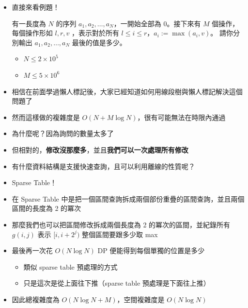 \documentclass[standalone]{beamer}
\begin{document}
\begin{frame}[fragile]{}
  \begin{itemize}
    \item 直接來看例題！
    \begin{problem}
      有一長度為 $N$ 的序列 $a_1,a_2,\dots,a_N$，一開始全部為 $0$。接下來有 $M$ 個操作，每個操作形如 $l, r, v$ ，表示對於所有 $l \leq i \leq r$，$a_i := \max(a_i, v)$。
      請你分別輸出 $a_1,a_2,\dots, a_N$ 最後的值是多少。

      \begin{itemize}
          \item
              $N \leq 2\times 10^5$
          \item
              $M \leq 5\times 10^6$
      \end{itemize}
    \end{problem}
  \end{itemize}
\end{frame}

\begin{frame}[fragile]{}
  \begin{itemize}
    \item 相信在前面學過懶人標記後，大家已經知道如何用線段樹與懶人標記解決這個問題了
    \item 然而這樣做的複雜度是 $O(N+M\log N)$，很有可能無法在時限內通過
    \item 為什麼呢？因為詢問的數量太多了
    \item 但相對的，\textbf{修改沒那麼多}，並且\textbf{我們可以一次處理所有修改}
    \item 有什麼資料結構是支援快速查詢，且可以利用離線的性質呢？
    \item Sparse Table！
  \end{itemize}
\end{frame}

\begin{frame}[fragile]{}
  \begin{itemize}
    \item 在 Sparse Table 中是把一個區間查詢拆成兩個部份重疊的區間查詢，並且兩個區間的長度為 2 的冪次
    \item 那麼我們也可以把區間修改拆成兩個長度為 2 的冪次的區間，並紀錄所有 $g(i, j)$ 表示 $[i, i+2^j)$ 整個區間要跟多少取 max
    \item 最後再一次花 $O(N\log N)$ DP 便能得到每個單獨的位置是多少
      \begin{itemize}
        \item 類似 sparse table 預處理的方式
        \item 只是這次是從上面往下推（sparse table 預處理是下面往上推）
      \end{itemize}
    \item 因此總複雜度為 $O(N\log N + M)$，空間複雜度是 $O(N\log N)$
  \end{itemize}
\end{frame}
\end{document}
